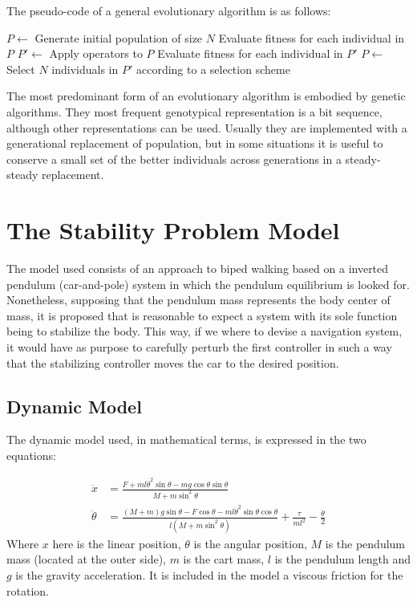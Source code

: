 \documentclass{sig-alternate}
\begin{document}
The pseudo-code of a general evolutionary algorithm is as follows:

\begin{algorithm}[h!]
  \caption{$Evolutionary Algorithm$}\label{alg:factorial}
  \begin{algorithmic}[1]
    \STATE $P \leftarrow$ Generate initial population of size $N$
    \STATE Evaluate fitness for each individual in $P$ \REPEAT \STATE
    $P' \leftarrow$ Apply operators to $P$ \STATE Evaluate fitness for
    each individual in $P'$ \STATE $P \leftarrow$ Select $N$
    individuals in $P'$ according to a selection scheme
  \end{algorithmic}
\end{algorithm}

The most predominant form of an evolutionary algorithm is embodied by
genetic algorithms. They most frequent genotypical representation is a
bit sequence, although other representations can be used. Usually they
are implemented with a generational replacement of population, but in
some situations it is useful to conserve a small set of the better
individuals across generations in a steady-steady replacement.

\section{The Stability Problem Model}
\label{sec:model}

The model used consists of an approach to biped walking based on a
inverted pendulum (car-and-pole) system in which the pendulum
equilibrium is looked for. Nonetheless, supposing that the pendulum
mass represents the body center of mass, it is proposed that is
reasonable to expect a system with its sole function being to
stabilize the body. This way, if we where to devise a navigation
system, it would have as purpose to carefully perturb the first
controller in such a way that the stabilizing controller moves the car
to the desired position.

\subsection*{Dynamic Model}
The dynamic model used, in mathematical terms, is expressed in the two
equations:

\begin{align}
  \label{eq:nf-simp}
  \ddot{x}&=\frac{F+ml\dot{\theta}^2\sin\theta-mg\cos\theta\sin\theta}{M+m\sin^2\theta}\\
  \ddot{\theta}&=\frac{(M+m)g\sin\theta-F\cos\theta-ml\dot{\theta}^2\sin\theta\cos\theta}{l(M+m\sin^2\theta)}+\frac{\tau}{ml^2}-\frac{\dot{\theta}}{2}
\end{align}
Where $x$ here is the linear position, $\theta$ is the angular
position, $M$ is the pendulum mass (located at the outer side), $m$ is
the cart mass, $l$ is the pendulum length and $g$ is the gravity
acceleration. It is included in the model a viscous friction for the
rotation.
\end{document}

